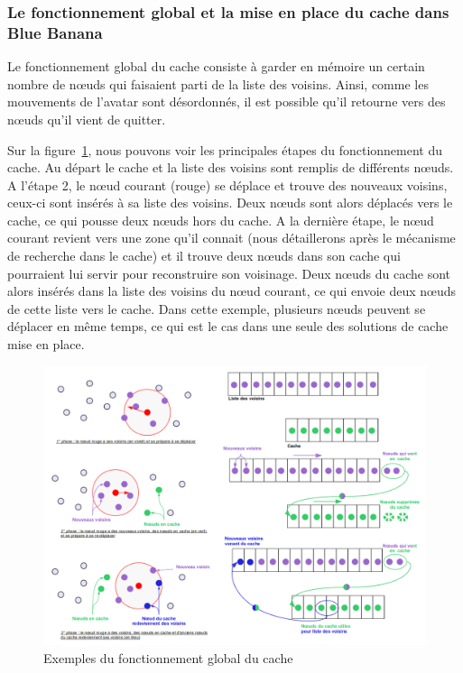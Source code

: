\subsubsection{Le fonctionnement global et la mise en place du cache dans Blue Banana}
Le fonctionnement global du cache consiste à garder en mémoire un certain nombre de nœuds qui faisaient parti de la liste des voisins. Ainsi, comme les mouvements de l'avatar sont désordonnés, il est possible qu'il retourne vers des nœuds qu'il vient de quitter. 
\par Sur la figure~\ref{cacheW}, nous pouvons voir les principales étapes du fonctionnement du cache. Au départ le cache et la liste des voisins sont remplis de différents nœuds. A l'étape 2, le nœud courant (rouge) se déplace et trouve des nouveaux voisins, ceux-ci sont insérés à sa liste des voisins. Deux nœuds sont alors déplacés vers le cache, ce qui pousse deux nœuds hors du cache. A la dernière étape, le nœud courant revient vers une zone qu'il connait (nous détaillerons après le mécanisme de recherche dans le cache) et il trouve deux nœuds dans son cache qui pourraient lui servir pour reconstruire son voisinage. Deux nœuds du cache sont alors insérés dans la liste des voisins du nœud courant, ce qui envoie deux nœuds de cette liste vers le cache. Dans cette exemple, plusieurs nœuds peuvent se déplacer en même temps, ce qui est le cas dans une seule des solutions de cache mise en place.
	\begin{figure}[!h]
        \centering
        \includegraphics[scale=0.35]{./Ressources/Images/cacheWextends.png}
        \caption{Exemples du fonctionnement global du cache}
        \label{cacheW}
        \end{figure} 
